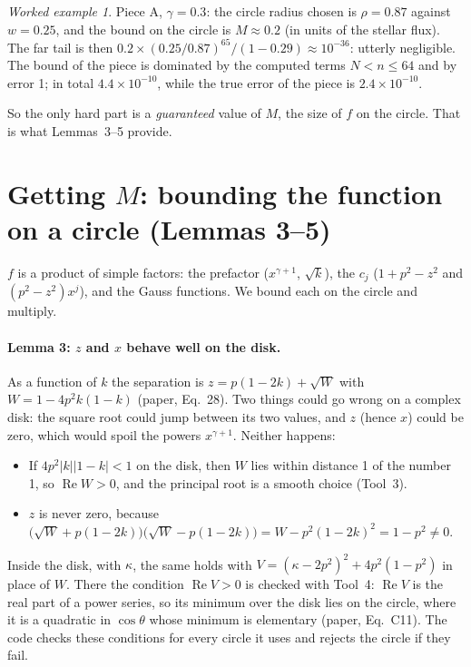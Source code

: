 \documentclass[11pt,a4paper]{article}
\theoremstyle{remark}
\newtheorem*{example}{Worked example}
\begin{document}
\begin{example}
Piece A, $\gamma=0.3$: the circle radius chosen is $\rho=0.87$ against $w=0.25$, and the bound on
the circle is $M\approx0.2$ (in units of the stellar flux). The far tail is then
$0.2\times(0.25/0.87)^{65}/(1-0.29)\approx10^{-36}$: utterly negligible. The bound of the piece is
dominated by the computed terms $N<n\le64$ and by error 1; in total $4.4\times10^{-10}$, while the
true error of the piece is $2.4\times10^{-10}$.
\end{example}

So the only hard part is a \emph{guaranteed} value of $M$, the size of $f$ on the circle. That is
what Lemmas~3--5 provide.

\section{Getting $M$: bounding the function on a circle (Lemmas 3--5)}

$f$ is a product of simple factors: the prefactor ($x^{\gamma+1}$, $\sqrt k$), the $c_j$
($1+p^2-z^2$ and $(p^2-z^2)x^j$), and the Gauss functions. We bound each on the circle and multiply.

\paragraph{Lemma 3: $z$ and $x$ behave well on the disk.} As a function of $k$ the separation is
$z=p(1-2k)+\sqrt{W}$ with $W=1-4p^2k(1-k)$ (paper, Eq.~28). Two things could go wrong on a complex
disk: the square root could jump between its two values, and $z$ (hence $x$) could be zero, which
would spoil the powers $x^{\gamma+1}$. Neither happens:
\begin{itemize}
  \item If $4p^2|k||1-k|<1$ on the disk, then $W$ lies within distance 1 of the number 1, so
        $\operatorname{Re}W>0$, and the principal root is a smooth choice (Tool~3).
  \item $z$ is never zero, because
        $\bigl(\sqrt W+p(1-2k)\bigr)\bigl(\sqrt W-p(1-2k)\bigr)=W-p^2(1-2k)^2=1-p^2\ne0$.
\end{itemize}
Inside the disk, with $\kappa$, the same holds with $V=(\kappa-2p^2)^2+4p^2(1-p^2)$ in place of $W$.
There the condition $\operatorname{Re}V>0$ is checked with Tool~4: $\operatorname{Re}V$ is the real
part of a power series, so its minimum over the disk lies on the circle, where it is a quadratic in
$\cos\theta$ whose minimum is elementary (paper, Eq.~C11). The code checks these conditions for every
circle it uses and rejects the circle if they fail.
\end{document}

